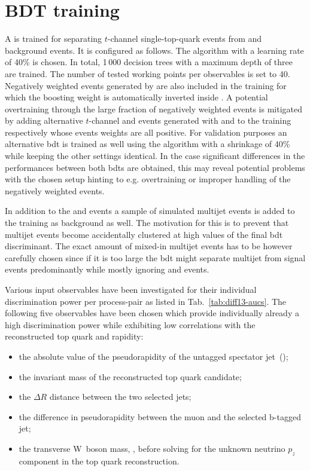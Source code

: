 \clearpage
\section{BDT training}
\label{sec:diff13-bdt}

A \bdt is trained for separating $t$-channel single-top-quark events from \wjets and \ttbar background events. It is configured as follows. The \ADABOOST algorithm with a learning rate of 40\% is chosen. In total, 1\,000 decision trees with a maximum depth of three are trained. The number of tested working points per observables is set to 40. Negatively weighted events generated by \MGAMC are also included in the training for which the boosting weight is automatically inverted inside \TMVA. A potential overtraining through the large fraction of negatively weighted events is mitigated by adding alternative $t$-channel and \wjets events generated with \POWHEG and \MG to the training respectively whose events weights are all positive. For validation purposes an alternative \gls{bdt} is trained as well using the \GRADIENTBOOST algorithm with a shrinkage of 40\% while keeping the other settings identical. In the case significant differences in the performances between both \glspl{bdt} are obtained, this may reveal potential problems with the chosen setup hinting to e.g. overtraining or improper handling of the negatively weighted events.

In addition to the \wjets and \ttbar events a sample of simulated multijet events is added to the training as background as well. The motivation for this is to prevent that multijet events become accidentally clustered at high values of the final \gls{bdt} discriminant. The exact amount of mixed-in multijet events has to be however carefully chosen since if it is too large the \gls{bdt} might separate multijet from signal events predominantly while mostly ignoring \wjets and \ttbar events.

Various input observables have been investigated for their individual discrimination power per process-pair as listed in Tab.~\ref{tab:diff13-aucs}. The following five observables have been chosen which provide individually already a high discrimination power while exhibiting low correlations with the reconstructed top quark \pt and rapidity:

\begin{itemize}
\item the absolute value of the pseudorapidity of the untagged spectator jet~(\jprime);
\item the invariant mass of the reconstructed top quark candidate;
\item the $\Delta R$ distance between the two selected jets;
\item the difference in pseudorapidity between the muon and the selected b-tagged jet;
\item the transverse W~boson mass, \mtw, before solving for the unknown neutrino $p_{z}$ component in the top quark reconstruction.
\end{itemize} 

